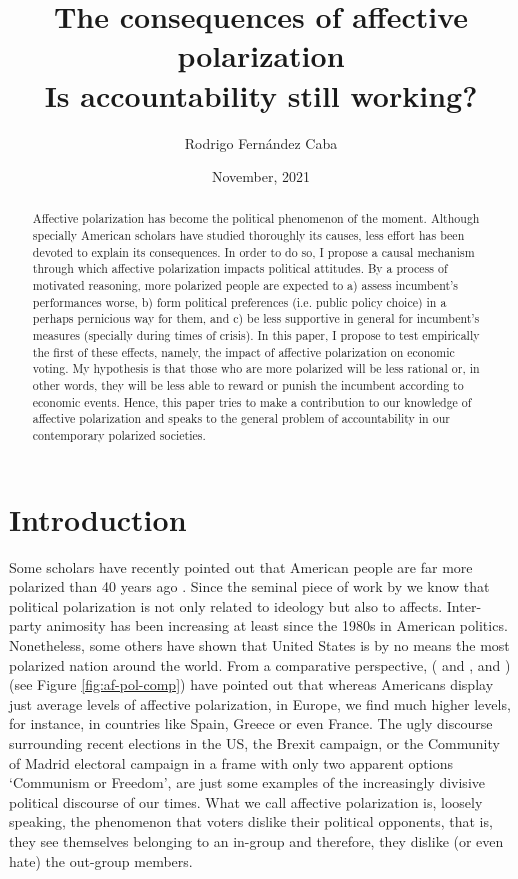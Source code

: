 \documentclass[a4paper, svgnames]{article}
\title{\vspace{-40pt}\textbf{The consequences of affective polarization\\ \Large Is accountability still working?}}
\author{Rodrigo Fernández Caba}
\date{\vspace{-5pt} November, 2021}
\begin{document}
\maketitle

\begin{abstract}
Affective polarization has become the political phenomenon of the moment. Although specially American scholars have studied thoroughly its causes, less effort has been devoted to explain its consequences. In order to do so, I propose a causal mechanism through which affective polarization impacts political attitudes. By a process of motivated reasoning, more polarized people are expected to a) assess incumbent's performances worse, b) form political preferences (i.e. public policy choice) in a perhaps pernicious way for them, and c) be less supportive in general for incumbent's measures (specially during times of crisis). In this paper, I propose to test empirically the first of these effects, namely, the impact of affective polarization on economic voting. My hypothesis is that those who are more polarized will be less rational or, in other words, they will be less able to reward or punish the incumbent according to economic events. Hence, this paper tries to make a contribution to our knowledge of affective polarization and speaks to the general problem of accountability in our contemporary polarized societies.
\end{abstract}


\section{Introduction}

Some scholars have recently pointed out that American people are far more polarized than 40 years ago \citep{Lelkes2018}. Since the seminal piece of work by \cite{Iyengar2012} we know that political polarization is not only related to ideology but also to affects. Inter-party animosity has been increasing at least since the 1980s in American politics. Nonetheless, some others have shown that United States is by no means the most polarized nation around the world. From a comparative perspective, (\citeauthor{Gidron2018} \citeyear{Gidron2018} and \citeyear{Gidron2019}, and \cite{WESTWOOD2018}) (see Figure \ref{fig:af-pol-comp}) have pointed out that whereas Americans display just average levels of affective polarization, in Europe, we find much higher levels, for instance, in countries like Spain, Greece or even France. The ugly discourse surrounding recent elections in the US, the Brexit campaign, or the Community of Madrid electoral campaign in a frame with only two apparent options `Communism or Freedom', are just some examples of the increasingly divisive political discourse of our times. What we call affective polarization is, loosely speaking, the phenomenon that voters dislike their political opponents, that is, they see themselves belonging to an in-group and therefore, they dislike (or even hate) the out-group members. 
\end{document}
